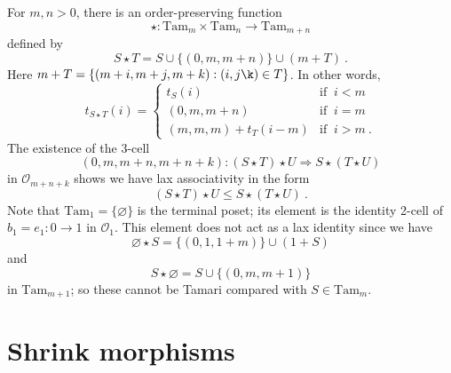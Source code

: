 \documentclass[a4paper,12pt,reqno]{amsart}
\theoremstyle{definition}
\theoremstyle{fact}
\theoremstyle{genquest}
\theoremstyle{step}
\newcommand{\lra}{\longrightarrow}
\newcommand{\Lra}{\Longrightarrow}
\def\CO{{\mathscr O}}
\begin{document}
For $m,n > 0$, there is an order-preserving function 
\begin{equation}
\star : \mathrm{Tam}_m \times \mathrm{Tam}_n \lra \mathrm{Tam}_{m+n}
\end{equation}
defined by 
$$S\star T = S\cup \{(0,m,m+n)\} \cup (m+T) \ .$$
Here $m+T = \{(m+i,m+j,m+k) : (i,j\k) \in T\}$.  
In other words,
\begin{equation*}
  t_{S\star T} (i) =
      \begin{cases}
         t_S(i) & \text{if } \  i < m  \\
         (0,m,m+n) & \text{if } \  i = m  \\
         (m,m,m)+t_T(i-m) & \text{if } \ i>m \ .
       \end{cases}
\end{equation*}
The existence of the 3-cell 
$$(0,m,m+n,m+n+k) : (S\star T)\star U \Lra S\star (T\star U)$$
in $\CO_{m+n+k}$ shows we have lax associativity in the form
\begin{equation}\label{Tamlaxassoc}
(S\star T)\star U \le S\star (T\star U) \ .
\end{equation} 
Note that $\mathrm{Tam}_1 = \{\varnothing\}$ is the terminal poset; 
its element is the identity 2-cell of $b_1 = e_1 : 0\lra 1$ in $\CO_1$.
This element does not act as a lax identity since we have 
$$\varnothing \star S =  \{(0,1,1+m)\} \cup (1+S)$$ 
and 
$$S \star \varnothing = S\cup \{(0,m,m+1)\}$$
in $\mathrm{Tam}_{m+1}$; so these cannot be Tamari compared with 
$S\in \mathrm{Tam}_{m}$.  

\section{Shrink morphisms}
\end{document}

